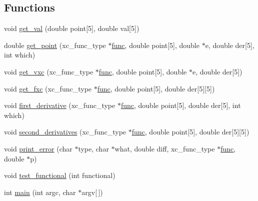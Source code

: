 \subsection*{Functions}
\begin{DoxyCompactItemize}
\item 
void \hyperlink{xc-consistency_8c_a1b237162beec038670f5745f1123b2d5}{get\-\_\-val} (double point\mbox{[}5\mbox{]}, double val\mbox{[}5\mbox{]})
\item 
double \hyperlink{xc-consistency_8c_a13d22a344d11851950ec7bf122468e35}{get\-\_\-point} (xc\-\_\-func\-\_\-type $\ast$\hyperlink{test_8c_a200d039021b3e9762ab6babd44bf5805}{func}, double point\mbox{[}5\mbox{]}, double $\ast$e, double der\mbox{[}5\mbox{]}, int which)
\item 
void \hyperlink{xc-consistency_8c_a07755ad1cbc935510d36c3ca2506ff1d}{get\-\_\-vxc} (xc\-\_\-func\-\_\-type $\ast$\hyperlink{test_8c_a200d039021b3e9762ab6babd44bf5805}{func}, double point\mbox{[}5\mbox{]}, double $\ast$e, double der\mbox{[}5\mbox{]})
\item 
void \hyperlink{xc-consistency_8c_a117c9714d2d2fd7ba9c90bc685a3a989}{get\-\_\-fxc} (xc\-\_\-func\-\_\-type $\ast$\hyperlink{test_8c_a200d039021b3e9762ab6babd44bf5805}{func}, double point\mbox{[}5\mbox{]}, double der\mbox{[}5\mbox{]}\mbox{[}5\mbox{]})
\item 
void \hyperlink{xc-consistency_8c_a274f371046383dfe78348d4f95fa487f}{first\-\_\-derivative} (xc\-\_\-func\-\_\-type $\ast$\hyperlink{test_8c_a200d039021b3e9762ab6babd44bf5805}{func}, double point\mbox{[}5\mbox{]}, double der\mbox{[}5\mbox{]}, int which)
\item 
void \hyperlink{xc-consistency_8c_ad494b759c7f00f4dbf7fb1c04176d9d8}{second\-\_\-derivatives} (xc\-\_\-func\-\_\-type $\ast$\hyperlink{test_8c_a200d039021b3e9762ab6babd44bf5805}{func}, double point\mbox{[}5\mbox{]}, double der\mbox{[}5\mbox{]}\mbox{[}5\mbox{]})
\item 
void \hyperlink{xc-consistency_8c_a24b5378988f870bc69922a5b4be473f5}{print\-\_\-error} (char $\ast$type, char $\ast$what, double diff, xc\-\_\-func\-\_\-type $\ast$\hyperlink{test_8c_a200d039021b3e9762ab6babd44bf5805}{func}, double $\ast$p)
\item 
void \hyperlink{xc-consistency_8c_a2488c01e1698bd00927535a2b64e4b95}{test\-\_\-functional} (int functional)
\item 
int \hyperlink{xc-consistency_8c_a0ddf1224851353fc92bfbff6f499fa97}{main} (int argc, char $\ast$argv\mbox{[}$\,$\mbox{]})
\end{DoxyCompactItemize}
